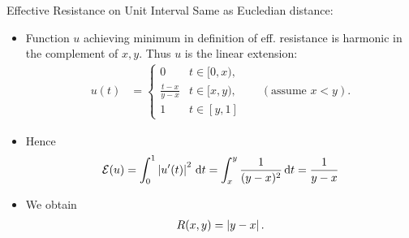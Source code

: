 \begin{frame}{Effective Resistance on Unit Interval}
  Same as Eucledian distance:
  \begin{itemize}
  \item Function $u$ achieving minimum in definition of eff. resistance is
    harmonic in the complement of $x,y$.  Thus $u$ is the linear
    extension:
    \begin{align*}
      u(t) &=
      \begin{cases}
        0 & t \in [0,x) ,\\
        \frac{t-x}{y-x} & t \in [x,y) ,\\
        1 & t \in [y,1]
      \end{cases} && (\text{assume } x<y).
    \end{align*}
  \item Hence
    \begin{align*}
      \mathcal{E}(u)
      = \int_{0}^{1} \left\vert u^{\prime}(t) \right\vert^{2} \, \mathrm{d}t
      =\int_{x}^{y}  \frac{1}{(y-x)^{2}} \, \mathrm{d}t
      = \frac{1}{y-x}
    \end{align*}
  \item We obtain
    \begin{align*}
      R(x,y) = \left\vert y-x \right\vert.
    \end{align*}
  \end{itemize}
  
\end{frame}

